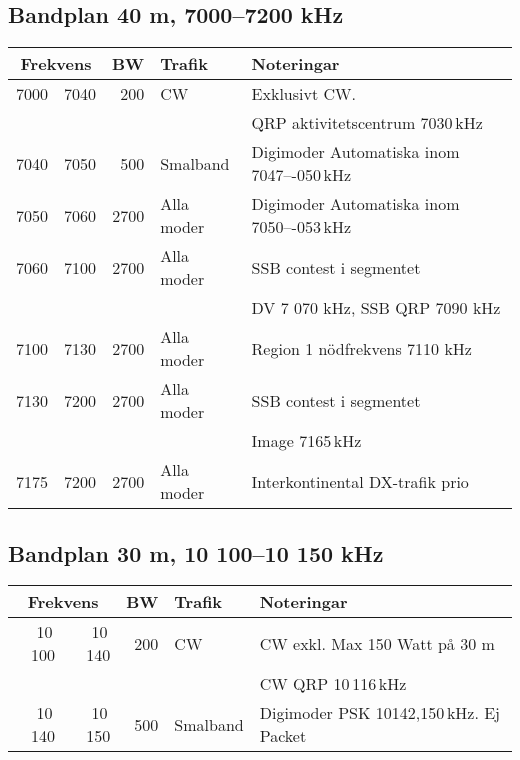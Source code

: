 {\subsection{Bandplan 40 m, 7000--7200 kHz}
\begin{tabular}{rrrll}
\multicolumn{2}{c}{\textbf{Frekvens}} & \textbf{BW} & \textbf{Trafik} & \textbf{Noteringar} \\ \hline
7000 & 7040 & 200  & CW         & Exklusivt CW.                             \\
     &      &      &            & QRP aktivitetscentrum 7030\,kHz           \\ \hline
7040 & 7050 & 500  & Smalband   & Digimoder Automatiska inom 7047–-050\,kHz \\ \hline
7050 & 7060 & 2700 & Alla moder & Digimoder Automatiska inom 7050–-053\,kHz \\ \hline
7060 & 7100 & 2700 & Alla moder & SSB contest i segmentet                   \\
     &      &      &            & DV 7 070 kHz, SSB QRP 7090 kHz            \\ \hline
7100 & 7130 & 2700 & Alla moder & Region 1 nödfrekvens 7110 kHz             \\ \hline
7130 & 7200 & 2700 & Alla moder & SSB contest i segmentet                   \\
     &      &      &            & Image 7165\,kHz                           \\ \hline
7175 & 7200 & 2700 & Alla moder & Interkontinental DX-trafik prio           \\ \hline
\end{tabular}

\subsection{Bandplan 30 m, 10 100--10 150 kHz}
\begin{tabular}{rrrll}
\multicolumn{2}{c}{\textbf{Frekvens}} & \textbf{BW} & \textbf{Trafik} & \textbf{Noteringar} \\ \hline
10\,100 & 10\,140 & 200 & CW       & CW exkl. Max 150 Watt på 30 m           \\
        &         &     &          & CW QRP 10\,116\,kHz                     \\ \hline
10\,140 & 10\,150 & 500 & Smalband & Digimoder PSK 10142,150\,kHz. Ej Packet \\ \hline
\end{tabular}

}
